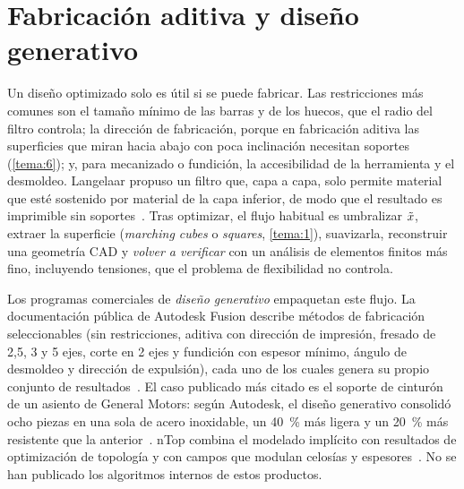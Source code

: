 \addtocounter{definicion}{1}%

\addtocounter{figure}{1}%

\section{Fabricación aditiva y diseño generativo}

Un diseño optimizado solo es útil si se puede fabricar. Las restricciones más comunes son el tamaño mínimo de las barras y de los huecos, que el radio del filtro controla; la dirección de fabricación, porque en fabricación aditiva las superficies que miran hacia abajo con poca inclinación necesitan soportes (\cref{tema:6}); y, para mecanizado o fundición, la accesibilidad de la herramienta y el desmoldeo. Langelaar propuso un filtro que, capa a capa, solo permite material que esté sostenido por material de la capa inferior, de modo que el resultado es imprimible sin soportes~\cite{langelaar}. Tras optimizar, el flujo habitual es umbralizar $\tilde{x}$, extraer la superficie (\emph{marching cubes} o \emph{squares}, \cref{tema:1}), suavizarla, reconstruir una geometría CAD y \emph{volver a verificar} con un análisis de elementos finitos más fino, incluyendo tensiones, que el problema de flexibilidad no controla.

Los programas comerciales de \emph{diseño generativo} empaquetan este flujo. La documentación pública de Autodesk Fusion describe métodos de fabricación seleccionables (sin restricciones, aditiva con dirección de impresión, fresado de 2,5, 3 y 5 ejes, corte en 2 ejes y fundición con espesor mínimo, ángulo de desmoldeo y dirección de expulsión), cada uno de los cuales genera su propio conjunto de resultados~\cite{fusiongd}. El caso publicado más citado es el soporte de cinturón de un asiento de General Motors: según Autodesk, el diseño generativo consolidó ocho piezas en una sola de acero inoxidable, un 40~\% más ligera y un 20~\% más resistente que la anterior~\cite{gmautodesk}. nTop combina el modelado implícito con resultados de optimización de topología y con campos que modulan celosías y espesores~\cite{ntop}. No se han publicado los algoritmos internos de estos productos.

